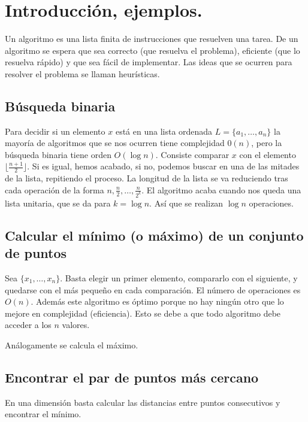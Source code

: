 \documentclass[AL.tex]{subfiles}
\begin{document}

\chapter{Introducción, ejemplos.}

Un algoritmo es una lista finita de instrucciones que resuelven una tarea. De un algoritmo se espera que sea correcto (que resuelva el problema), eficiente (que lo resuelva rápido) y que sea fácil de implementar. Las ideas que se ocurren para resolver el problema se llaman heurísticas. 
\section{Búsqueda binaria}

Para decidir si un elemento $x$ está en una lista ordenada $L=\{a_1,\dots, a_n\}$ la mayoría de algoritmos que se nos ocurren tiene complejidad $0(n)$, pero la búsqueda binaria tiene orden $O(\log n)$. Consiste comparar $x$ con el elemento $\lfloor \frac{n+1}{2}\rfloor$. Si es igual, hemos acabado, si no, podemos buscar en una de las mitades de la lista, repitiendo el proceso. La longitud de la lista se va reduciendo tras cada operación de la forma $n, \frac{n}{2}, \dots, \frac{n}{2^k}$. El algoritmo acaba cuando nos queda una lista unitaria, que se da para $k=\log n$. Así que se realizan $\log n$ operaciones. 

\section{Calcular el mínimo (o máximo) de un conjunto de puntos}
Sea $\{x_1,\dots, x_n\}$. Basta elegir un primer elemento, compararlo con el siguiente, y quedarse con el más pequeño en cada comparación. El número de operaciones es $O(n)$. Además este algoritmo es óptimo porque no hay ningún otro que lo mejore en complejidad (eficiencia). Esto se debe a que todo algoritmo debe acceder a los $n$ valores. 

Análogamente se calcula el máximo. 



\section{Encontrar el par de puntos más cercano}

En una dimensión basta calcular las distancias entre puntos consecutivos y encontrar el mínimo.
\end{document}
